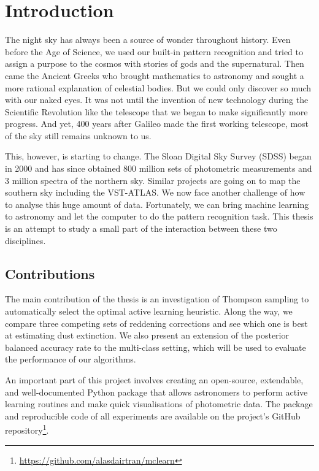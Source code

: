 
\chapter{Introduction}
\label{cha:intro}
The night sky has always been a source of wonder throughout history. Even before the Age of
Science, we used our built-in pattern recognition and tried to assign a purpose to
the cosmos with stories of gods and the supernatural. Then came the Ancient Greeks who brought
mathematics to astronomy and sought a more rational explanation of celestial bodies.
But we could only discover so much with our naked eyes. It was not until the invention
of new technology during the Scientific Revolution like the telescope that we began to
make significantly more progress. And yet, 400 years after Galileo made the first working
telescope, most of the sky still remains unknown to us.

This, however, is starting to change. The Sloan Digital Sky Survey (SDSS) began
in 2000 and has since obtained 800 million sets of photometric measurements
and 3 million spectra of the northern sky. Similar projects are going on
to map the southern sky including the VST-ATLAS. We now face another challenge of how
to analyse this huge amount of data. Fortunately, we can bring machine learning
to astronomy and let the computer to do the pattern recognition task.
This thesis is an attempt to study a small part of the interaction between these
two disciplines.

\section{Contributions}
\label{sec:contributions}
The main contribution of the thesis is an investigation of Thompson sampling to automatically
select the optimal active learning heuristic. Along the way, we compare three competing sets
of reddening corrections and see which one is best at estimating dust extinction.
We also present an extension of the
posterior balanced accuracy rate to the multi-class setting, which will be used to evaluate
the performance of our algorithms.

An important part of this project involves creating an
open-source, extendable, and well-documented Python package that allows astronomers to perform active learning
routines and make quick visualisations of photometric data. The package and
reproducible code of all experiments are available on the project's GitHub repository\footnote{
	\url{https://github.com/alasdairtran/mclearn}}.



